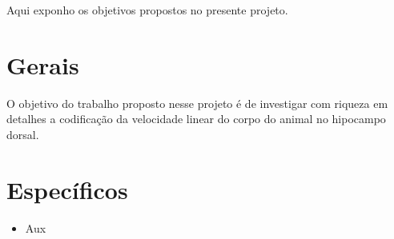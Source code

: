 
\label{Cap:Objetivos}

Aqui exponho os objetivos propostos no presente projeto. 

\section{Gerais}
\label{Sec:general}

O objetivo do trabalho proposto nesse projeto é de investigar com riqueza em detalhes a codificação da velocidade linear do corpo do animal no hipocampo dorsal.

\section{Específicos}
\label{Sec:specific}

\begin{itemize}
\item Aux 
\end{itemize}


